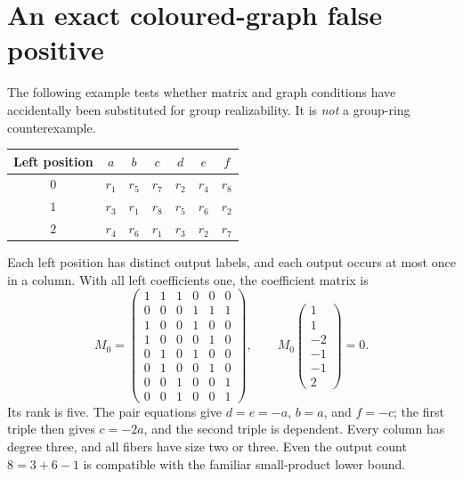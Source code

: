 \documentclass[11pt,a4paper,oneside]{report}
\theoremstyle{definition}
\theoremstyle{remark}
\begin{document}
\section{An exact coloured-graph false positive}\label{M02:sec:falsepositive}
The following example tests whether matrix and graph conditions have accidentally been substituted for group realizability. It is \emph{not} a group-ring counterexample.
\begin{center}
\begin{tabular}{c|cccccc}
\toprule
Left position & \(a\)&\(b\)&\(c\)&\(d\)&\(e\)&\(f\)\\
\midrule
\(0\)&\(r_1\)&\(r_5\)&\(r_7\)&\(r_2\)&\(r_4\)&\(r_8\)\\
\(1\)&\(r_3\)&\(r_1\)&\(r_8\)&\(r_5\)&\(r_6\)&\(r_2\)\\
\(2\)&\(r_4\)&\(r_6\)&\(r_1\)&\(r_3\)&\(r_2\)&\(r_7\)\\
\bottomrule
\end{tabular}
\end{center}
Each left position has distinct output labels, and each output occurs at most once in a column. With all left coefficients one, the coefficient matrix is
\[
M_0=
\begin{pmatrix}
1&1&1&0&0&0\\
0&0&0&1&1&1\\
1&0&0&1&0&0\\
1&0&0&0&1&0\\
0&1&0&1&0&0\\
0&1&0&0&1&0\\
0&0&1&0&0&1\\
0&0&1&0&0&1
\end{pmatrix},\qquad
M_0
\begin{pmatrix}1\\1\\-2\\-1\\-1\\2\end{pmatrix}=0.
\]
Its rank is five. The pair equations give \(d=e=-a\), \(b=a\), and \(f=-c\); the first triple then gives \(c=-2a\), and the second triple is dependent. Every column has degree three, and all fibers have size two or three. Even the output count \(8=3+6-1\) is compatible with the familiar small-product lower bound.
\end{document}
